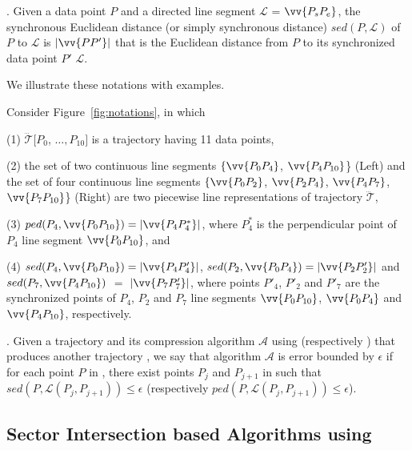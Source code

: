 . Given a data point $P$ and a directed line segment $\mathcal{L}$ = $\vv{P_{s}P_{e}}$, the synchronous Euclidean distance (or simply synchronous distance) $sed(P, \mathcal{L})$ of $P$ to $\mathcal{L}$ is $|\vv{PP'}|$ that is the Euclidean distance from $P$ to its synchronized data point $P'$ \wrt $\mathcal{L}$. %




We illustrate these notations with examples.


\begin{example}
\label{exm-notations}
Consider Figure~\ref{fig:notations}, in which

\sstab(1) $\dddot{\mathcal{T}}[P_0$, $\ldots, P_{10}]$ is a trajectory having 11 data points,

\sstab (2) the set of two continuous line segments $\{\vv{P_0P_4}$, $\vv{P_4P_{10}}$\} (Left) and the set of four continuous line segments $\{\vv{P_0P_2}$, $\vv{P_2P_4}$, $\vv{P_4P_7}$, $\vv{P_7P_{10}}$\} (Right) are two piecewise line representations of trajectory $\dddot{\mathcal{T}}$,

\sstab(3) $ped(P_4, \vv{P_0P_{10}})=|\vv{P_4P^*_4}|$, where $P^*_4$ is the perpendicular point of $P_4$ \wrt line segment $\vv{P_0P_{10}}$, and

\sstab (4) $sed(P_4, \vv{P_0P_{10}})= |\vv{P_4P'_4}|$, $sed(P_2, \vv{P_0P_{4}})= |\vv{P_2P'_2}|$ and $sed(P_7, \vv{P_4P_{10}})$ $=$ $|\vv{P_7P'_7}|$,
where points $P'_4$, $P'_2$ and $P'_7$ are the synchronized points of $P_4$, $P_2$ and $P_7$ \wrt line segments $\vv{P_0P_{10}}$, $\vv{P_0P_{4}}$ and $\vv{P_4P_{10}}$, respectively.
\end{example}

. Given a trajectory  and its compression  algorithm $\mathcal{A}$ using \sed (respectively \ped) that produces another trajectory ,
we say that algorithm $\mathcal{A}$ is error bounded by $\epsilon$ if  for each point $P$ in , there exist points $P_j$ and $P_{j+1}$ in  such that $sed(P, \mathcal{L}(P_j,P_{j+1}))\le \epsilon$ (respectively $ped(P, \mathcal{L}(P_j,P_{j+1}))\le \epsilon$).




\subsection{Sector Intersection based Algorithms using \ped}
\label{sub-ci-ped}


